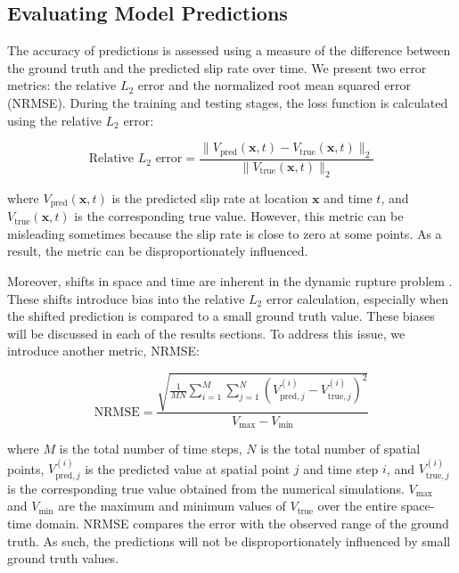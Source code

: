 \documentclass[draft]{agujournal2019}
\begin{document}
\subsection{Evaluating Model Predictions}
\label{sec:eval}

The accuracy of predictions is assessed using a measure of the difference between the ground truth and the predicted slip rate over time. We present two error metrics: the relative \(L_2\) error and the normalized root mean squared error (NRMSE). During the training and testing stages, the loss function is calculated using the relative \(L_2\) error:

\begin{equation}
\label{eqn:rel_l2}
\text{Relative } L_2 \text{ error} = \frac{\| V_{\text{pred}}(\mathbf{x}, t) - V_{\text{true}}(\mathbf{x}, t) \|_2}{\| V_{\text{true}}(\mathbf{x}, t) \|_2}
\end{equation}

where \(V_{\text{pred}}(\mathbf{x}, t)\) is the predicted slip rate at location \(\mathbf{x}\) and time \(t\), and \(V_{\text{true}}(\mathbf{x}, t)\) is the corresponding true value. However, this metric can be misleading sometimes because the slip rate is close to zero at some points. As a result, the metric can be disproportionately influenced. 

Moreover, shifts in space and time are inherent in the dynamic rupture problem \cite{barall2015metrics}. These shifts introduce bias into the relative \(L_2\) error calculation, especially when the shifted prediction is compared to a small ground truth value. These biases will be discussed in each of the results sections. To address this issue, we introduce another metric, NRMSE:

\begin{equation}
\label{eqn:NRMSE}
\text{NRMSE} = \frac{\sqrt{\frac{1}{M N} \sum_{i=1}^{M} \sum_{j=1}^{N} \left( V_{\text{pred}, j}^{(i)} - V_{\text{true}, j}^{(i)} \right)^2 }}{V_{\max} - V_{\min}}
\end{equation}

where \(M\) is the total number of time steps, \(N\) is the total number of spatial points, \(V_{\text{pred}, j}^{(i)}\) is the predicted value at spatial point \(j\) and time step \(i\), and \(V_{\text{true}, j}^{(i)}\) is the corresponding true value obtained from the numerical simulations. \(V_{\max}\) and \(V_{\min}\) are the maximum and minimum values of \(V_{\text{true}}\) over the entire space-time domain. NRMSE compares the error with the observed range of the ground truth. As such, the predictions will not be disproportionately influenced by small ground truth values.
\end{document}
